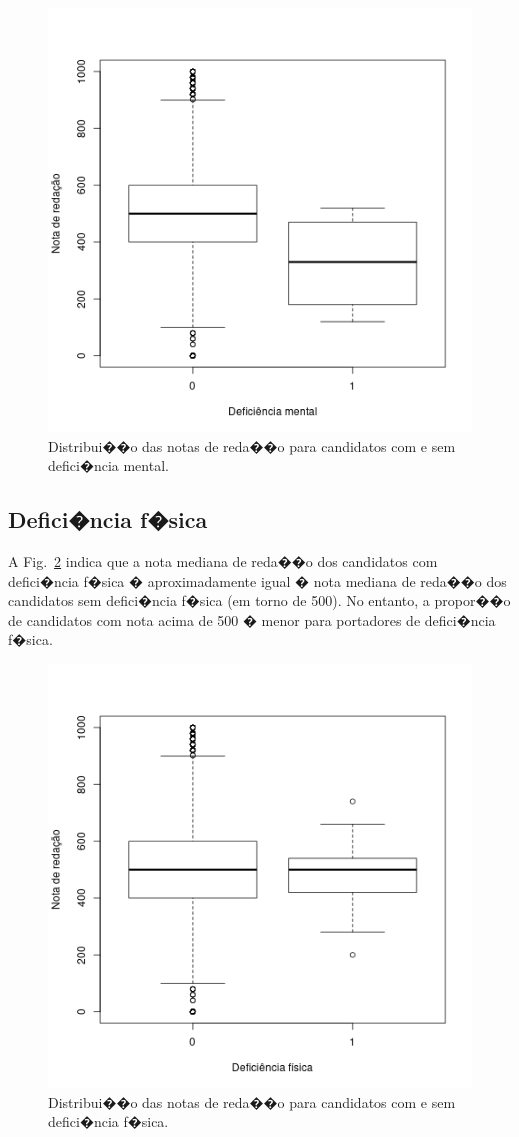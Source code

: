\documentclass[12pt]{article}
\newcommand{\reffig}[1]{Fig.~\ref{fig:#1}}
\begin{document}
\begin{figure}[H]
\centering\includegraphics[width=.55\linewidth]{../correlacao_deficiencia_mental.png}
\caption{Distribui��o das notas de reda��o para candidatos com e sem defici�ncia mental.}
\label{fig:correlacao-deficiencia-mental}
\end{figure}

\subsection{Defici�ncia f�sica}
A \reffig{correlacao-deficiencia-fisica} indica que a nota mediana de reda��o dos candidatos com defici�ncia f�sica � aproximadamente igual � nota mediana de reda��o dos candidatos sem defici�ncia f�sica (em torno de 500).
No entanto, a propor��o de candidatos com nota acima de 500 � menor para portadores de defici�ncia f�sica.
\begin{figure}[H]
\centering\includegraphics[width=.55\linewidth]{../correlacao_deficiencia_fisica.png}
\caption{Distribui��o das notas de reda��o para candidatos com e sem defici�ncia f�sica.}
\label{fig:correlacao-deficiencia-fisica}
\end{figure}
\end{document}
